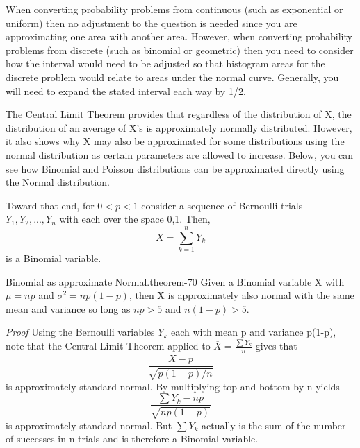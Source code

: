 \documentclass[10pt,]{book}
\makeatletter
\renewcommand*{\proofname}{Proof}
\renewenvironment{proof}[1][\proofname]{\par
  \pushQED{\qed}%
  \normalfont \topsep6\p@\@plus6\p@\relax
  \trivlist
  \item\relax
    {\itshape
    #1\@addpunct{.}}\hspace\labelsep\ignorespaces
}{%
  \popQED\endtrivlist\@endpefalse
}
\numberwithin{equation}{section}
\newcommand{\lt}{<}
\newcommand{\gt}{>}
\makeatother
\begin{document}
%
\par
\hypertarget{p-1293}{}%
When converting probability problems from continuous (such as exponential or uniform) then no adjustment to the question is needed since you are approximating one area with another area. However, when converting probability problems from discrete (such as binomial or geometric) then you need to consider how the interval would need to be adjusted so that histogram areas for the discrete problem would relate to areas under the normal curve. Generally, you will need to expand the stated interval each way by 1/2.%
\par
\hypertarget{p-1294}{}%
The Central Limit Theorem provides that regardless of the distribution of X, the distribution of an average of X's is approximately normally distributed. However, it also shows why X may also be approximated for some distributions using the normal distribution as certain parameters are allowed to increase. Below, you can see how Binomial and Poisson distributions can be approximated directly using the Normal distribution.%
\par
\hypertarget{p-1295}{}%
Toward that end, for \(0 \lt p \lt 1\) consider a sequence of Bernoulli trials \(Y_1, Y_2, ..., Y_n\) with each over the space {0,1}. Then,%
\begin{equation*}
X = \sum_{k=1}^n Y_k
\end{equation*}
is a Binomial variable.%
\begin{theorem}{Binomial as approximate Normal.}{}{theorem-70}%
\hypertarget{p-1296}{}%
Given a Binomial variable X with \(\mu = np\) and \(\sigma^2 = np(1-p)\), then X is approximately also normal with the same mean and variance so long as \(np \gt 5\) and \(n(1-p) \gt 5\).%
\end{theorem}
\begin{proof}\hypertarget{proof-69}{}
\hypertarget{p-1297}{}%
Using the Bernoulli variables \(Y_k\) each with mean p and variance p(1-p), note that the Central Limit Theorem applied to \(\overline{X} = \frac{\sum Y_k}{n}\) gives that%
\begin{equation*}
\frac{\overline{X}-p}{\sqrt{p(1-p)/n}}
\end{equation*}
is approximately standard normal. By multiplying top and bottom by n yields%
\begin{equation*}
\frac{\sum Y_k - np}{\sqrt{np(1-p)}}
\end{equation*}
is approximately standard normal. But \(\sum Y_k\) actually is the sum of the number of successes in n trials and is therefore a Binomial variable.%
\end{proof}
\end{document}
